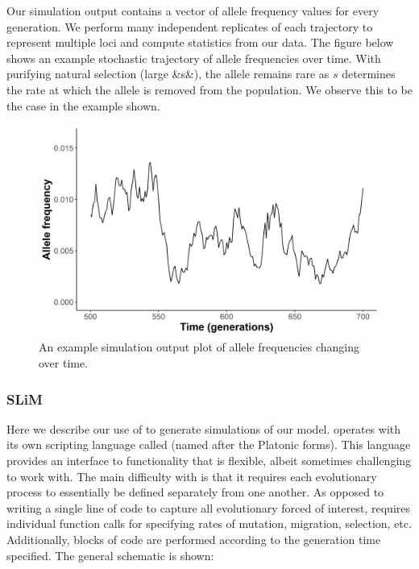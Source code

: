 

Our simulation output contains a vector of allele frequency values for every generation. We perform many independent replicates of each trajectory to represent multiple loci and compute statistics from our data. The figure below shows an example stochastic trajectory of allele frequencies over time. With purifying natural selection (large &s&), the allele remains rare as $s$ determines the rate at which the allele is removed from the population. We observe this to be the case in the example shown.


\begin{figure}[h]
    \centering
    \includegraphics[scale=0.5]{img/time_series.jpg}
    \caption{An example simulation output plot of allele frequencies changing over time.}
    \label{fig:time_series}
\end{figure}

\subsubsection{SLiM}

Here we describe our use of  to generate simulations of our model.  operates with its own scripting language called  (named after the Platonic forms). This language provides an interface to  functionality that is flexible, albeit sometimes challenging to work with. The main difficulty with  is that it requires each evolutionary process to essentially be defined separately from one another. As opposed to writing a single line of code to capture all evolutionary forced of interest,  requires individual function calls for specifying rates of mutation, migration, selection, etc. Additionally, blocks of code are performed according to the generation time specified. The general schematic is shown:


